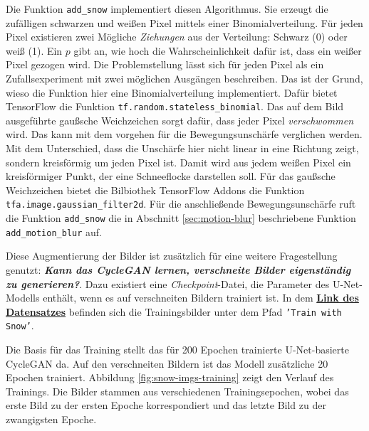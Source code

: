 Die Funktion \texttt{add_snow} implementiert diesen Algorithmus. Sie erzeugt die zufälligen schwarzen und weißen Pixel mittels einer Binomialverteilung. Für jeden Pixel existieren zwei Mögliche \emph{Ziehungen} aus der Verteilung: Schwarz (0) oder weiß (1). Ein $p$ gibt an, wie hoch die Wahrscheinlichkeit dafür ist, dass ein weißer Pixel gezogen wird. Die Problemstellung lässt sich für jeden Pixel als ein Zufallsexperiment mit zwei möglichen Ausgängen beschreiben. Das ist der Grund, wieso die Funktion hier eine Binomialverteilung implementiert. Dafür bietet TensorFlow die Funktion \texttt{tf.random.stateless_binomial}. Das auf dem Bild ausgeführte gaußsche Weichzeichen sorgt dafür, dass jeder Pixel \emph{verschwommen} wird. Das kann mit dem vorgehen für die Bewegungsunschärfe verglichen werden. Mit dem Unterschied, dass die Unschärfe hier nicht linear in eine Richtung zeigt, sondern kreisförmig um jeden Pixel ist. Damit wird aus jedem weißen Pixel ein kreisförmiger Punkt, der eine Schneeflocke darstellen soll. Für das gaußsche Weichzeichen bietet die Bilbiothek TensorFlow Addons die Funktion \texttt{tfa.image.gaussian_filter2d}. Für die anschließende Bewegungsunschärfe ruft die Funktion \texttt{add_snow} die in Abschnitt \ref{sec:motion-blur} beschriebene Funktion \texttt{add_motion_blur} auf. \cite{geometric-ops}

Diese Augmentierung der Bilder ist zusätzlich für eine weitere Fragestellung genutzt: \textbf{\emph{Kann das \ac{CycleGAN} lernen, verschneite Bilder eigenständig zu generieren?}}. Dazu existiert eine \emph{Checkpoint}-Datei, die Parameter des U-Net-Modells enthält, wenn es auf verschneiten Bildern trainiert ist. In dem \href{https://drive.google.com/drive/folders/1310Eb5WDgaszu47k6V8St5m-QtQV1Ocg?usp=sharing}{\textbf{Link des Datensatzes}} befinden sich die Trainingsbilder unter dem Pfad \texttt{'Train with Snow'}.

Die Basis für das Training stellt das für 200 Epochen trainierte U-Net-basierte \ac{CycleGAN} da. Auf den verschneiten Bildern ist das Modell zusätzliche 20 Epochen trainiert. Abbildung \ref{fig:snow-imgs-training} zeigt den Verlauf des Trainings. Die Bilder stammen aus verschiedenen Trainingsepochen, wobei das erste Bild zu der ersten Epoche korrespondiert und das letzte Bild zu der zwangigsten Epoche.

